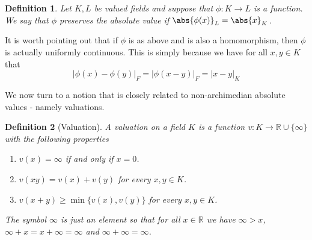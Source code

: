 \documentclass{article}
\newtheorem{definition}{Definition}[section]
\newtheorem{proposition}{Proposition}[section]
\newcommand{\mbb}[1]{\mathbb{#1}}
\begin{document}
\begin{definition}
    Let $K, L$ be valued fields and suppose that $\phi : K \to L$ is a function. We say that $\phi$ preserves the absolute value if $\abs{\phi(x)}_L = \abs{x}_K$.
\end{definition}

It is worth pointing out that if $\phi$ is as above and is also a homomorphism, then $\phi$ is actually uniformly continuous. This is simply because we have for all $x,y \in K$ that
$$|\phi(x) - \phi(y)|_F = |\phi(x-y)|_F = |x-y|_K$$ 





We now turn to a notion that is closely related to non-archimedian absolute values - namely valuations. 

\begin{definition}[Valuation]
    A valuation on a field $K$ is a function $v : K \to \mbb R \cup \{\infty\}$ with the following properties 
    \begin{enumerate}
        \item $v(x) = \infty$ if and only if $x = 0$.
        \item $v(xy) = v(x) + v(y)$ for every $x,y \in K$. 
        \item $v(x + y) \geq \min \{v(x), v(y)\}$ for every $x,y \in K$.
    \end{enumerate}
    The symbol $\infty$ is just an element so that for all $x \in \mbb R$ we have $\infty > x$,  $\infty + x = x + \infty = \infty$ and $\infty + \infty = \infty$. 
\end{definition}
\end{document}
